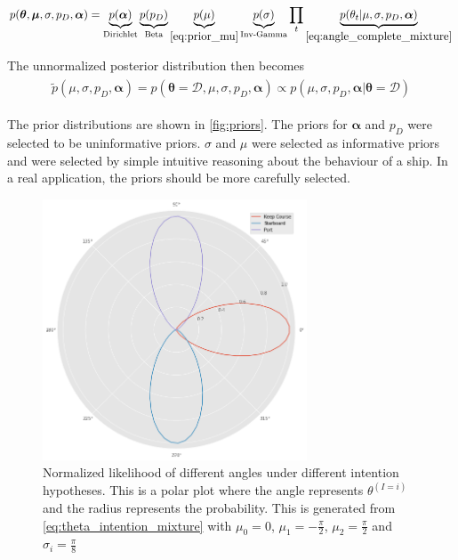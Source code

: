 \begin{align}\label{eq:example_joint}
\begin{split}
    p(\boldsymbol{\theta}, \boldsymbol{\mu}, \sigma, p_D, \boldsymbol{\alpha}) =\underbrace{p(\boldsymbol{\alpha})}_{\text{Dirichlet}}\underbrace{p(p_D)}_{\text{Beta}}\underbrace{p(\mu)}_{\eqref{eq:prior_mu}} \underbrace{p(\sigma)}_{\text{Inv-Gamma}} \prod_t \underbrace{p(\theta_t | \mu, \sigma, p_D, \boldsymbol{\alpha})}_{\eqref{eq:angle_complete_mixture}}
\end{split}
\end{align}

The unnormalized posterior distribution then becomes
\begin{align}\label{eq:example_unnormalized_posterior}
\begin{split}
    \tilde{p}(\mu, \sigma, p_D, \boldsymbol{\alpha}) =  p(\boldsymbol{\theta} = \mathcal{D}, \mu, \sigma, p_D, \boldsymbol{\alpha}) \propto p(\mu, \sigma, p_D, \boldsymbol{\alpha} | \boldsymbol{\theta}= \mathcal{D})
\end{split}
\end{align}

The prior distributions are shown in \cref{fig:priors}. The priors for $\boldsymbol{\alpha}$ and $p_D$ were selected to be uninformative priors. $\sigma$ and $\mu$ were selected as informative priors and were selected by simple intuitive reasoning about the behaviour of a ship. In a real application, the priors should be more carefully selected. 

\begin{figure}
    \centering
    \includegraphics[width=0.7\textwidth]{figures/intention_angle.png}
    \caption{Normalized likelihood of different angles under different intention hypotheses. This is a polar plot where the angle represents $\theta^{(I=i)}$ and the radius represents the probability. This is generated from \cref{eq:theta_intention_mixture} with $\mu_0=0$, $\mu_1 = -\frac{\pi}{2}$, $\mu_2=\frac{\pi}{2}$ and $\sigma_i=\frac{\pi}{8}$}
    \label{fig:intention_angle}
\end{figure}

